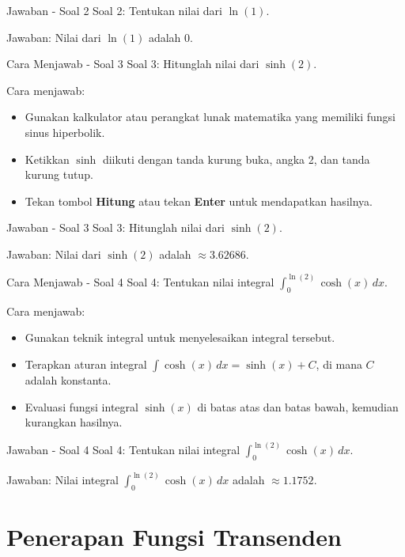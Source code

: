 \documentclass{beamer}
\begin{document}
\begin{frame}{Jawaban - Soal 2}
  Soal 2: Tentukan nilai dari $\ln(1)$.

  Jawaban: Nilai dari $\ln(1)$ adalah $0$.
\end{frame}

\begin{frame}{Cara Menjawab - Soal 3}
  Soal 3: Hitunglah nilai dari $\sinh(2)$.

  Cara menjawab:
  \begin{itemize}
    \item Gunakan kalkulator atau perangkat lunak matematika yang memiliki fungsi sinus hiperbolik.
    \item Ketikkan $\sinh$ diikuti dengan tanda kurung buka, angka 2, dan tanda kurung tutup.
    \item Tekan tombol \textbf{Hitung} atau tekan \textbf{Enter} untuk mendapatkan hasilnya.
  \end{itemize}
\end{frame}

\begin{frame}{Jawaban - Soal 3}
  Soal 3: Hitunglah nilai dari $\sinh(2)$.

  Jawaban: Nilai dari $\sinh(2)$ adalah $\approx 3.62686$.
\end{frame}

\begin{frame}{Cara Menjawab - Soal 4}
  Soal 4: Tentukan nilai integral $\int_{0}^{\ln(2)} \cosh(x) \, dx$.

  Cara menjawab:
  \begin{itemize}
    \item Gunakan teknik integral untuk menyelesaikan integral tersebut.
    \item Terapkan aturan integral $\int \cosh(x) \, dx = \sinh(x) + C$, di mana $C$ adalah konstanta.
    \item Evaluasi fungsi integral $\sinh(x)$ di batas atas dan batas bawah, kemudian kurangkan hasilnya.
  \end{itemize}
\end{frame}

\begin{frame}{Jawaban - Soal 4}
  Soal 4: Tentukan nilai integral $\int_{0}^{\ln(2)} \cosh(x) \, dx$.

  Jawaban: Nilai integral $\int_{0}^{\ln(2)} \cosh(x) \, dx$ adalah $\approx 1.1752$.
\end{frame}

\section{Penerapan Fungsi Transenden}
\end{document}
